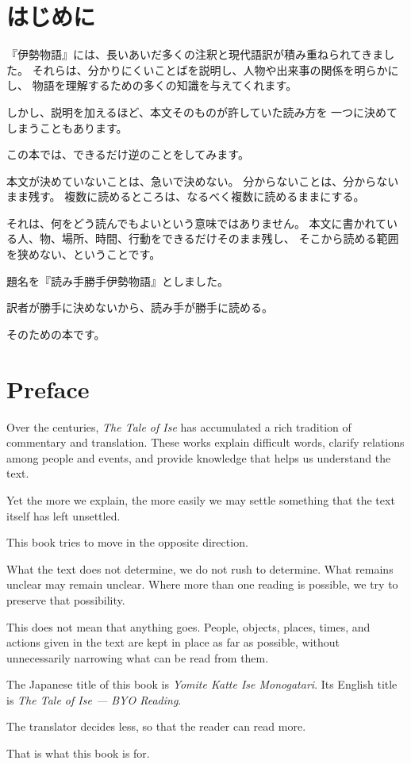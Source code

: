 \ifJA

\section*{はじめに}

『伊勢物語』には、長いあいだ多くの注釈と現代語訳が積み重ねられてきました。
それらは、分かりにくいことばを説明し、人物や出来事の関係を明らかにし、
物語を理解するための多くの知識を与えてくれます。

しかし、説明を加えるほど、本文そのものが許していた読み方を
一つに決めてしまうこともあります。

この本では、できるだけ逆のことをしてみます。

本文が決めていないことは、急いで決めない。
分からないことは、分からないまま残す。
複数に読めるところは、なるべく複数に読めるままにする。

それは、何をどう読んでもよいという意味ではありません。
本文に書かれている人、物、場所、時間、行動をできるだけそのまま残し、
そこから読める範囲を狭めない、ということです。

題名を『読み手勝手伊勢物語』としました。

訳者が勝手に決めないから、読み手が勝手に読める。

そのための本です。

\else

\section*{Preface}

Over the centuries, \textit{The Tale of Ise} has accumulated a rich tradition
of commentary and translation. These works explain difficult words,
clarify relations among people and events, and provide knowledge that helps
us understand the text.

Yet the more we explain, the more easily we may settle something
that the text itself has left unsettled.

This book tries to move in the opposite direction.

What the text does not determine, we do not rush to determine.
What remains unclear may remain unclear.
Where more than one reading is possible, we try to preserve that possibility.

This does not mean that anything goes.
People, objects, places, times, and actions given in the text are kept in place
as far as possible, without unnecessarily narrowing what can be read from them.

The Japanese title of this book is
\textit{Yomite Katte Ise Monogatari}.
Its English title is \textit{The Tale of Ise --- BYO Reading}.

The translator decides less,
so that the reader can read more.

That is what this book is for.

\fi
